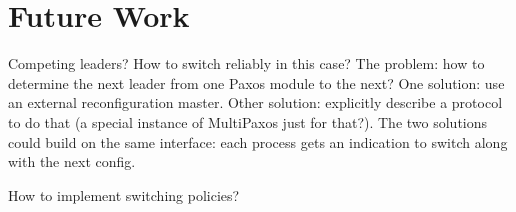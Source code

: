 \section{Future Work}

Competing leaders? How to switch reliably in this case?
The problem: how to determine the next leader from one Paxos module to the next?
One solution: use an external reconfiguration master.
Other solution: explicitly describe a protocol to do that (a special instance of MultiPaxos just for that?).
The two solutions could build on the same interface: each process gets an indication to switch along with the next config.

How to implement switching policies?
